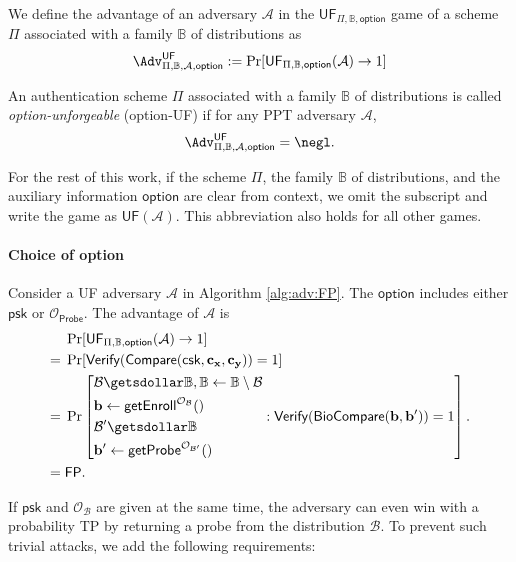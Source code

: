 We define the advantage of an adversary $\mathcal{A}$ in the $\textsf{UF}_{\Pi, \mathbb{B}, \textsf{option}}$ game of a scheme $\Pi$ associated with a family $\mathbb{B}$ of distributions as
\[
	\Adv^{\textsf{UF}}_{\Pi, \mathbb{B}, \mathcal{A}, \textsf{option}} := \Pr[\textsf{UF}_{\Pi, \mathbb{B}, \textsf{option}}(\mathcal{A}) \to 1]
\]

An authentication scheme $\Pi$ associated with a family $\mathbb{B}$ of distributions is called \emph{\textsf{option}-unforgeable} (\textsf{option}-UF) if for any PPT adversary $\mathcal{A}$,
\[
	\Adv^{\textsf{UF}}_{\Pi, \mathbb{B}, \mathcal{A}, \textsf{option}} = \negl.
\]

For the rest of this work, if the scheme $\Pi$, the family $\mathbb{B}$ of distributions, and the auxiliary information $\textsf{option}$ are clear from context, we omit the subscript and write the game as $\textsf{UF}(\mathcal{A})$. This abbreviation also holds for all other games.

\paragraph{Choice of \textsf{option}}
\noindent Consider a \textsf{UF} adversary $\mathcal{A}$ in Algorithm \ref{alg:adv:FP}. The $\textsf{option}$ includes either $\textsf{psk}$ or $\mathcal{O}_{\textsf{Probe}}$. The advantage of $\mathcal{A}$ is
\begin{align*}
	& \Pr[\textsf{UF}_{\Pi, \mathbb{B}, \textsf{option}}(\mathcal{A}) \to 1] \\ 
	=\; & \Pr [ \textsf{Verify}(\textsf{Compare}(\textsf{csk}, \mathbf{c_x}, \mathbf{c_y})) = 1 ] \\
	=\; & \Pr \left [
		\begin{aligned}
			& \mathcal{B} \getsdollar \mathbb{B}, \mathbb{B} \gets \mathbb{B} \setminus \mathcal{B} \\
			& \mathbf{b} \gets \textsf{getEnroll}^{\mathcal{O}_{\mathcal{B}} }() \\
			& \mathcal{B}^\prime \getsdollar \mathbb{B} \\
			& \mathbf{b}^\prime \gets \textsf{getProbe}^{\mathcal{O}_{\mathcal{B}^\prime} }()
		\end{aligned}
		: \textsf{Verify}(\textsf{BioCompare}(\mathbf{b}, \mathbf{b}^\prime)) = 1 \right ]. \\
	=\; & \textsf{FP}.
\end{align*}

\noindent If $\textsf{psk}$ and $\mathcal{O}_{\mathcal{B}}$ are given at the same time, the adversary can even win with a probability \textsf{TP} by returning a probe from the distribution $\mathcal{B}$. To prevent such trivial attacks, we add the following requirements:

